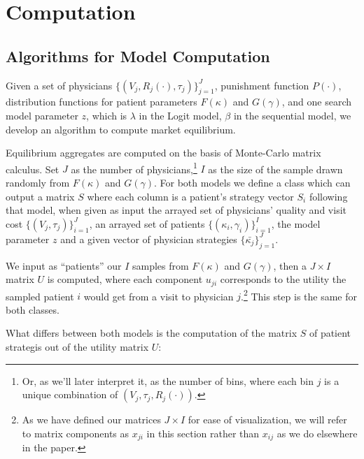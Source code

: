 \documentclass[../main.tex]{subfiles}
\begin{document}
\section{Computation}

\subsection{Algorithms for Model Computation}

Given a set of physicians $\{(V_j, R_j(\cdot), \tau_j)\}_{j =1}^{J}$, punishment function $P(\cdot)$, distribution functions for patient parameters $F(\kappa)$ and $G(\gamma)$, and one search model parameter $z$, which is $\lambda$ in the Logit model, $\beta$ in the sequential model, we develop an algorithm to compute market equilibrium.

Equilibrium aggregates are computed on the basis of Monte-Carlo matrix calculus. Set $J$ as the number of physicians,\footnote{Or, as we'll later interpret it, as the number of bins, where each bin $j$ is a unique combination of $ (V_j, \tau_j, R_j(\cdot))$.} $I$ as the size of the sample drawn randomly from $F(\kappa)$ and $G(\gamma)$. For both models we define a class which can output a matrix $S$ where each column is a patient's strategy vector $S_i$ following that model, when given as input the arrayed set of physicians' quality and visit cost $\{(V_j, \tau_j)\}_{i =1}^{J}$, an arrayed set of patients $\{(\kappa_i,\gamma_i)\}_{i =1}^{I}$, the model parameter $z$ and a given vector of physician strategies $\{\bar{\kappa_j}\}_{j =1}^{J}$.

We input as ``patients'' our $I$ samples from $F(\kappa)$ and $G(\gamma)$, then a $J \times I$ matrix $U$ is computed, where each component $u_{ji}$ corresponds to the utility the sampled patient $i$ would get from a visit to physician $j$.\footnote{As we have defined our matrices $J \times I$ for ease of visualization, we will refer to matrix components as $x_{ji}$ in this section rather than $x_{ij}$ as we do elsewhere in the paper.} This step is the same for both classes.

What differs between both models is the computation of the matrix $S$ of patient strategis out of the utility matrix $U$:
\end{document}
